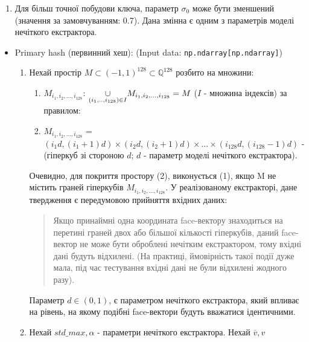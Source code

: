 \documentclass[11pt]{article}
\providecommand{\tightlist}{%
      \setlength{\itemsep}{0pt}\setlength{\parskip}{0pt}}
\begin{document}
\begin{itemize}
\begin{itemize}
    \begin{enumerate}
    \def\labelenumi{\arabic{enumi}.}
    \setcounter{enumi}{1}
    \tightlist
    \item
      Для більш точної побудови ключа, параметр \(\sigma_0\) може бути
      зменшений (значення за замовчуванням: 0.7). Дана змінна є одним з
      параметрів моделі нечіткого екстрактора.
    \end{enumerate}
  \end{itemize}
\end{itemize}

    \begin{itemize}
\tightlist
\item
  Primary hash (первинний хеш): (Input data:
  \texttt{np.ndarray{[}np.ndarray{]}})

  \begin{enumerate}
  \def\labelenumi{\arabic{enumi}.}
  \item
    Нехай простір \(M \subset (-1,1)^{128} \subset \mathbb{Q}^{128}\)
    розбито на множини:

    \begin{enumerate}
    \def\labelenumii{(\arabic{enumii})}
    \item
      \(M_{i_1,i_2,...,i_{128}}\):
      \(\space \underset{(i_1,..,i_{128}) \in I}{\large{\cup}}  {\small{M}_{i_1,i_2,...,i_{128}}} = M\)
      (\(I\) - множина індексів) за правилом:
    \item
      \(M_{i_1,i_2,...,i_{128}}\) =
      \((i_1d,(i_1+1)d)\times(i_2d,(i_2+1)d)\times...\times(i_{128}d,(i_{128}-1)d)\)
      - (гіперкуб зі стороною \(d\); \(d\) - параметр моделі нечіткого
      екстрактора).
    \end{enumerate}

    Очевидно, для покриття простору (2), виконується (1), якщо M не
    містить граней гіперкубів \(M_{i_1,i_2,...,i_{128}}\). У
    реалізованому екстракторі, дане твердження є передумовою прийняття
    вхідних даних:

    \begin{quote}
    Якщо принаймні одна координата face-вектору знаходиться на перетині
    граней двох або більшої кількості гіперкубів, даний face-вектор не
    може бути оброблені нечітким екстрактором, тому вхідні дані будуть
    відхилені. (На практиці, ймовірність такої події дуже мала, під час
    тестування вхідні дані не були відхилені жодного разу).
    \end{quote}

    Параметр \(d \in (0,1)\), є параметром нечіткого екстрактора, який
    впливає на рівень, на якому подібні face-вектори будуть вважатися
    ідентичними.
  \item
    Нехай \(std\_max,\alpha\) - параметри нечіткого екстрактора.
    Нехай \(\overline{v},\overset{\text{~}}{v}\)
  \end{enumerate}


\end{itemize}
\end{document}
